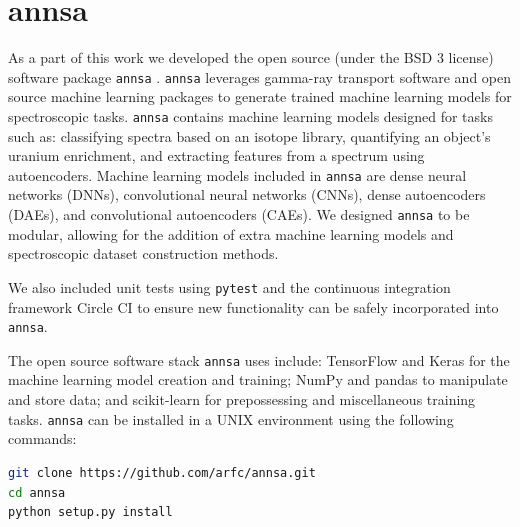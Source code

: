 


\section{annsa}

As a part of this work we developed the open source (under the BSD 3 license) software package \verb|annsa| \cite{annsa}. \verb|annsa| leverages gamma-ray transport software and open source machine learning packages to generate trained machine learning models for spectroscopic tasks. \verb|annsa| contains machine learning models designed for tasks such as: classifying spectra based on an isotope library, quantifying an object's uranium enrichment, and extracting features from a spectrum using autoencoders. Machine learning models included in \verb|annsa| are dense neural networks (DNNs), convolutional neural networks (CNNs), dense autoencoders (DAEs), and convolutional autoencoders (CAEs). We designed \verb|annsa| to be modular, allowing for the addition of extra machine learning models and spectroscopic dataset construction methods. 

We also included unit tests using \verb|pytest| \cite{pytest3.5} and the continuous integration framework Circle CI to ensure new functionality can be safely incorporated into \verb|annsa|.

The open source software stack \verb|annsa| uses include: TensorFlow \cite{tensorflow2015-whitepaper} and Keras \cite{chollet2015keras} for the machine learning model creation and training; NumPy \cite{numpy} and pandas \cite{mckinney-proc-scipy-2010} to manipulate and store data; and scikit-learn \cite{scikit-learn} for prepossessing and miscellaneous training tasks. \verb|annsa| can be installed in a UNIX environment using the following commands:
\begin{lstlisting}[language=bash, basicstyle={\small\ttfamily}]
git clone https://github.com/arfc/annsa.git
cd annsa
python setup.py install
\end{lstlisting}

